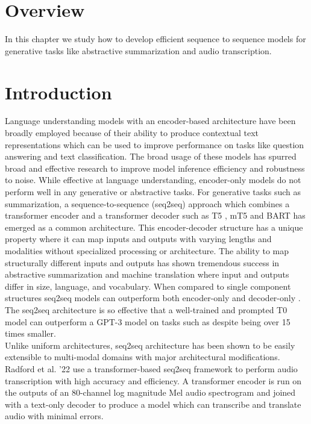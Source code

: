 \section{Overview}
In this chapter we study how to develop efficient sequence to sequence models for generative tasks like abstractive summarization and audio transcription. 
\section{Introduction}
Language understanding models with an encoder-based architecture have been broadly employed because of their ability to produce contextual text representations which can be used to improve performance on tasks like question answering and text classification. The broad usage of these models has spurred broad and effective research to improve model inference efficiency and robustness to noise. While effective at language understanding, encoder-only models do not perform well in any generative or abstractive tasks. For generative tasks such as summarization, a sequence-to-sequence (seq2seq) approach which combines a transformer encoder and a transformer decoder such as T5 \cite{Raffel2020ExploringTL}, mT5 \cite{Xue2021mT5AM} and BART \cite{Lewis2020BARTDS} has emerged as a common architecture. This encoder-decoder structure has a unique property where it can map inputs and outputs with varying lengths and modalities without specialized processing or architecture. The ability to map structurally different inputs and outputs has shown tremendous success in abstractive summarization and machine translation where input and outputs differ in size, language, and vocabulary. When compared to single component structures seq2seq models can outperform both encoder-only \cite{Zhuang2022RankT5FT} and decoder-only \cite{Sanh2022MultitaskPT}. The seq2seq architecture is so effective that a well-trained and prompted T0 model can outperform a GPT-3 model on tasks such as  \cite{Sanh2022MultitaskPT} despite being over 15 times smaller. \\
Unlike uniform architectures, seq2seq architecture has been shown to be easily extensible to multi-modal domains with major architectural modifications. Radford et al. '22 \cite{Radford2022RobustSR} use a transformer-based seq2seq framework to perform audio transcription with high accuracy and efficiency. A transformer encoder is run on the outputs of an 80-channel log magnitude Mel audio spectrogram and joined with a text-only decoder to produce a model which can transcribe and translate audio with minimal errors. \\
